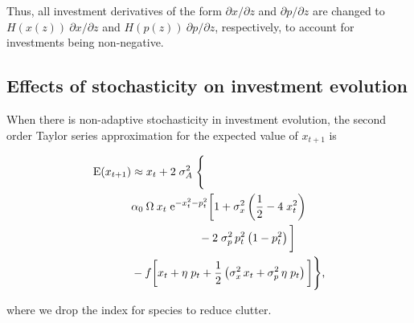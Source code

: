 Thus, all investment derivatives of the form $\partial x / \partial z$
and $\partial p / \partial z$
are changed to $H(x(z)) \: \partial x / \partial z$ and
$H(p(z)) \: \partial p / \partial z$, respectively, to
account for investments being non-negative.



\subsection*{Effects of stochasticity on investment evolution}

When there is non-adaptive stochasticity in investment evolution,
the second order Taylor series approximation for the expected
value of $x_{t+1}$ is

\begin{equation}
\label{eq:taylor-expansion-final}
\begin{split}
    \text{E}(x_{t+1}) & \approx
        x_{t} + 2 \; \sigma_A^2 \; \Bigg\{ \\
            & \alpha_0 \: \Omega \: 
            x_{t} \; \text{e}^{-x_{t}^2 - p_{t}^2} 
            \bigg[ 
                1 + \sigma^2_{x} \left( \frac{1}{2} - 4 \; x_{t}^2 \right) \\
                & \hspace*{6em} - 2 \; \sigma^2_{p} \, p_{t}^2 \left( 1 - p_{t}^2 \right)
            \bigg] \\
            & - f \bigg[
                x_{t} + \eta \; p_{t} + \frac{1}{2} \left(
                    \sigma^2_{x} \, x_{t} + \sigma^2_{p} \, \eta \; p_{t}
                \right)
            \bigg]
        \Bigg\}
\text{,}
\end{split}
\end{equation}

\noindent where we drop the index for species to reduce clutter.


